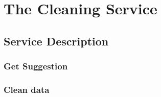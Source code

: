 \section{The Cleaning Service}
\label{sec:cleaningService}



\subsection{Service Description}
\label{sec:serviceDescription}


\subsubsection{Get Suggestion}


\subsubsection{Clean data}



\

